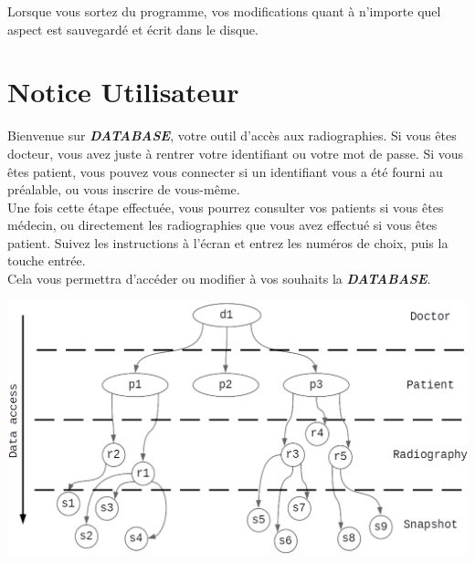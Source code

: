 \documentclass[12pt,a4paper]{article}
\newenvironment{Figure}
{\par\medskip\noindent\minipage{\linewidth}}
{\endminipage\par\medskip}
\begin{document}
\begin{multicols}{2}
		Lorsque vous sortez du programme, vos modifications quant à n'importe quel aspect est sauvegardé et écrit dans le disque.
		
		\section{Notice Utilisateur}
		
		Bienvenue sur \textbf{\textit{DATABASE}}, votre outil d'accès aux radiographies. Si vous êtes docteur, vous avez juste à rentrer votre identifiant ou votre mot de passe. Si vous êtes patient, vous pouvez vous connecter si un identifiant vous a été fourni au préalable, ou vous inscrire de vous-même. \\
		
		Une fois cette étape effectuée, vous pourrez consulter vos patients si vous êtes médecin, ou directement les radiographies que vous avez effectué si vous êtes patient. Suivez les instructions à l'écran et entrez les numéros de choix, puis la touche entrée. \\
		
		Cela vous permettra d'accéder ou modifier à vos souhaits la \textbf{\textit{DATABASE}}.
		
		\end{multicols}
		
		\begin{Figure}
			\centering
			\includegraphics[width=0.7\linewidth]{images/structure.png}
			\label{fig:structure}
		\end{Figure}
	
	\pagebreak
	
\end{document}
